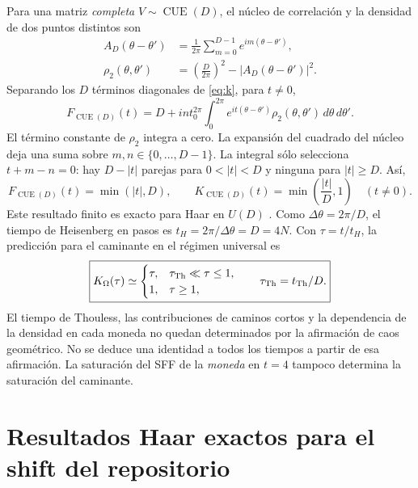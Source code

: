\documentclass[11pt]{article}
\newcommand{\CUE}{\operatorname{CUE}}
\begin{document}
Para una matriz \emph{completa} $V\sim\CUE(D)$, el núcleo de correlación
y la densidad de dos puntos distintos son
\begin{align}
 A_D(\theta-\theta')&=\frac1{2\pi}
        \sum_{m=0}^{D-1}e^{im(\theta-\theta')},\\
 \rho_2(\theta,\theta')&=\left(\frac D{2\pi}\right)^2
                  -|A_D(\theta-\theta')|^2.
\end{align}
Separando los $D$ términos diagonales de \eqref{eq:k}, para $t\neq0$,
\begin{equation}
 F_{\CUE(D)}(t)=D+int_0^{2\pi}\!\int_0^{2\pi}
  e^{it(\theta-\theta')}\rho_2(\theta,\theta')\,d\theta\,d\theta'.
\end{equation}
El término constante de $\rho_2$ integra a cero. La expansión del
cuadrado del núcleo deja una suma sobre $m,n\in\{0,\ldots,D-1\}$.
La integral sólo selecciona $t+m-n=0$: hay $D-|t|$ parejas para
$0<|t|<D$ y ninguna para $|t|\geq D$. Así,
\begin{equation}
 \boxed{F_{\CUE(D)}(t)=\min(|t|,D),\qquad
        K_{\CUE(D)}(t)=\min\left(\frac{|t|}{D},1\right)}
 \quad(t\neq0).
 \label{eq:cue}
\end{equation}
Este resultado finito es exacto para Haar en $U(D)$ \cite{bertini}.
Como $\Delta\theta=2\pi/D$, el tiempo de Heisenberg en pasos es
$t_H=2\pi/\Delta\theta=D=4N$. Con $\tau=t/t_H$, la predicción para
el caminante en el régimen universal es
\begin{equation}
 \boxed{K_\Omega(\tau)\simeq
 \begin{cases}\tau,&\tau_{\rm Th}\ll\tau\leq1,\\
               1,&\tau\geq1,
 \end{cases}\qquad \tau_{\rm Th}=t_{\rm Th}/D.}
\end{equation}
El tiempo de Thouless, las contribuciones de caminos cortos y la
dependencia de la densidad en cada moneda no quedan determinados por
la afirmación de caos geométrico. No se deduce una identidad a todos
los tiempos a partir de esa afirmación. La saturación del SFF de la
\emph{moneda} en $t=4$ tampoco determina la saturación del caminante.

\section{Resultados Haar exactos para el shift del repositorio}
\end{document}
